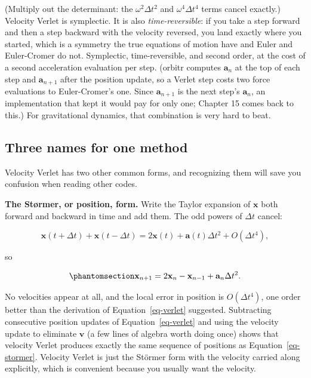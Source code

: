 \documentclass[
  10.5pt,
  letterpaper,
]{scrbook}
\theoremstyle{plain}
\theoremstyle{remark}
\begin{document}
(Multiply out the determinant: the \(\omega^2\Delta t^2\) and
\(\omega^4\Delta t^4\) terms cancel exactly.) Velocity Verlet is
symplectic. It is also \emph{time-reversible}: if you take a step
forward and then a step backward with the velocity reversed, you land
exactly where you started, which is a symmetry the true equations of
motion have and Euler and Euler-Cromer do not. Symplectic,
time-reversible, and second order, at the cost of a second acceleration
evaluation per step. (orbitr computes \(\mathbf{a}_n\) at the top of
each step and \(\mathbf{a}_{n+1}\) after the position update, so a
Verlet step costs two force evaluations to Euler-Cromer's one. Since
\(\mathbf{a}_{n+1}\) is the next step's \(\mathbf{a}_n\), an
implementation that kept it would pay for only one; Chapter 15 comes
back to this.) For gravitational dynamics, that combination is very hard
to beat.

\subsection{Three names for one
method}\label{three-names-for-one-method}

Velocity Verlet has two other common forms, and recognizing them will
save you confusion when reading other codes.

\textbf{The Størmer, or position, form.} Write the Taylor expansion of
\(\mathbf{x}\) both forward and backward in time and add them. The odd
powers of \(\Delta t\) cancel:

\[
\mathbf{x}(t+\Delta t) + \mathbf{x}(t-\Delta t) = 2\mathbf{x}(t) + \mathbf{a}(t)\Delta t^2 + O(\Delta t^4),
\]

so

\begin{equation}\protect\phantomsection\label{eq-stormer}{
\mathbf{x}_{n+1} = 2\mathbf{x}_n - \mathbf{x}_{n-1} + \mathbf{a}_n\Delta t^2.
}\end{equation}

No velocities appear at all, and the local error in position is
\(O(\Delta t^4)\), one order better than the derivation of
Equation~\ref{eq-verlet} suggested. Subtracting consecutive position
updates of Equation~\ref{eq-verlet} and using the velocity update to
eliminate \(\mathbf{v}\) (a few lines of algebra worth doing once) shows
that velocity Verlet produces exactly the same sequence of positions as
Equation~\ref{eq-stormer}. Velocity Verlet is just the Störmer form with
the velocity carried along explicitly, which is convenient because you
usually want the velocity.
\end{document}
